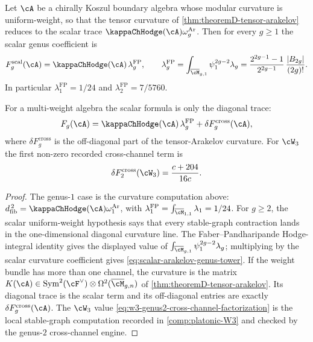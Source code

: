 \begin{theorem}
\label{thm:scalar-arakelov-genus-tower}
Let $\cA$ be a chirally Koszul boundary algebra whose modular curvature
is uniform-weight, so that the tensor curvature of
\cref{thm:theoremD-tensor-arakelov} reduces to the scalar trace
$\kappaChHodge(\cA)\omega_g^{\mathrm{Ar}}$. Then for every $g\ge1$ the scalar
genus coefficient is
\begin{equation}\label{eq:scalar-arakelov-genus-tower}
 F_g^{\mathrm{scal}}(\cA)
 =
 \kappaChHodge(\cA)\,\lambda_g^{\mathrm{FP}},
 \qquad
 \lambda_g^{\mathrm{FP}}
 =
 \int_{\overline{\cM}_{g,1}}\psi_1^{2g-2}\lambda_g
 =
 \frac{2^{2g-1}-1}{2^{2g-1}}\,
 \frac{|B_{2g}|}{(2g)!}.
\end{equation}
In particular $\lambda_1^{\mathrm{FP}}=1/24$ and
$\lambda_2^{\mathrm{FP}}=7/5760$.

For a multi-weight algebra the scalar formula is only the diagonal
trace:
\begin{equation}\label{eq:multi-weight-arakelov-correction}
 F_g(\cA)
 =
 \kappaChHodge(\cA)\,\lambda_g^{\mathrm{FP}}
 +
 \delta F_g^{\mathrm{cross}}(\cA),
\end{equation}
where $\delta F_g^{\mathrm{cross}}$ is the off-diagonal part of the
tensor-Arakelov curvature. For $\cW_3$ the first non-zero recorded
cross-channel term is
\begin{equation}\label{eq:w3-genus2-cross-channel-factorization}
 \delta F_2^{\mathrm{cross}}(\cW_3)
 =
 \frac{c+204}{16c}.
\end{equation}
\end{theorem}

\begin{proof}
The genus-$1$ case is the curvature computation above:
$\dfib^{\,2}=\kappaChHodge(\cA)\omega_1^{\mathrm{Ar}}$, with
$\lambda_1^{\mathrm{FP}}=\int_{\overline{\cM}_{1,1}}\lambda_1=1/24$.
For $g\ge2$, the scalar uniform-weight hypothesis says that every
stable-graph contraction lands in the one-dimensional diagonal
curvature line. The Faber--Pandharipande Hodge-integral identity gives
the displayed value of
$\int_{\overline{\cM}_{g,1}}\psi_1^{2g-2}\lambda_g$; multiplying by
the scalar curvature coefficient gives
\eqref{eq:scalar-arakelov-genus-tower}. If the weight bundle has more
than one channel, the curvature is the matrix
$K(\cA)\in\operatorname{Sym}^2(\cF^\vee)\otimes
\Omega^2(\overline{\cM}_{g,n})$ of
\cref{thm:theoremD-tensor-arakelov}. Its diagonal trace is the scalar
term and its off-diagonal entries are exactly
$\delta F_g^{\mathrm{cross}}(\cA)$. The $\cW_3$ value
\eqref{eq:w3-genus2-cross-channel-factorization} is the local
stable-graph computation recorded in
\cref{comp:platonic-W3} and checked by the genus-$2$ cross-channel
engine.
\end{proof}


